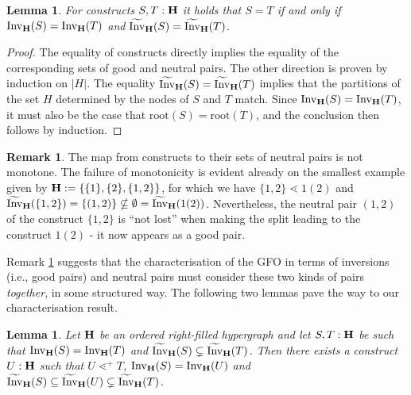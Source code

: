 \documentclass{article}
\theoremstyle{plain}
\newtheorem{lemma}[thm]{Lemma}
\theoremstyle{definition}
\newtheorem{remark}[thm]{Remark}
\newcommand{\Invt}{\widetilde{\mathrm{Inv}}}
\newcommand{\Inv}{{\mathrm{Inv}}}
\begin{document}
\begin{lemma}\label{eee}
For constructs $S,T:{\bf H}$ it holds that $S=T$ if and only if $\Inv_{\bf H}(S)=\Inv_{\bf H}(T)$ and $\Invt_{\bf H}(S)=\Invt_{\bf H}(T)$.
\end{lemma}
\begin{proof}
The equality of constructs directly implies the equality of the corresponding sets of good and neutral pairs. The other direction is proven by induction on $|H|$. The equality $\Invt_{\bf H}(S)=\Invt_{\bf H}(T)$ implies that the partitions of the set $H$ determined by the nodes of $S$ and $T$ match. Since $\Inv_{\bf H}(S)=\Inv_{\bf H}(T)$, it must also be the case that $\text{root}(S)=\text{root}(T)$, and the conclusion then follows by induction. 
\end{proof}

\begin{remark}\label{nor}
The map from constructs to their sets of neutral pairs is not monotone. The failure of monotonicity is evident already on the smallest example given by ${\bf H}:=\{\{1\},\{2\},\{1,2\}\}$, for which we have $\{1,2\}\lessdot 1(2)$ and $\Invt_{\bf H}(\{1,2\})=\{(1,2)\} \nsubseteq \emptyset = \Invt_{\bf H}(1(2))$. Nevertheless, the neutral pair $(1,2)$ of the construct $\{1,2\}$ is ``not lost'' when making the split leading to the construct $1(2)$ - it now appears as a good pair. 
 \end{remark}
Remark \ref{nor} suggests that the characterisation of the GFO in terms of inversions (i.e., good pairs) and neutral pairs must consider these two kinds of pairs {\em together}, in some structured way. The following two lemmas pave the way to our characterisation result.


\begin{lemma}\label{s14}
Let ${\bf H}$ be an ordered right-filled hypergraph and let $S,T:{\bf H}$ be such that $\Inv_{\bf H}(S)= \Inv_{\bf H}(T)$ and $\Invt_{\bf H}(S)\subsetneq \Invt_{\bf H}(T)$. Then there exists a construct $U:{\bf H}$ such that $U\lessdot^+ T$, $\Inv_{\bf H}(S)= \Inv_{\bf H}(U)$ and $\Invt_{\bf H}(S)\subseteq\Invt_{\bf H}(U)\subsetneq \Invt_{\bf H}(T)$. 
\end{lemma}
\end{document}
